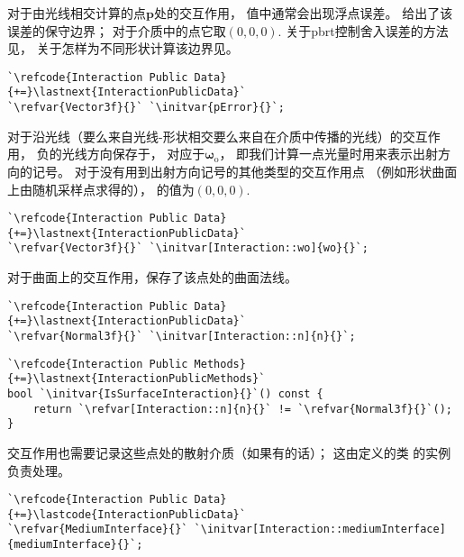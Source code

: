 对于由光线相交计算的点$\bm p$处的交互作用，
值中通常会出现浮点误差。
给出了该误差的保守边界；
对于介质中的点它取$(0,0,0)$.
关于pbrt控制舍入误差的方法见，
关于怎样为不同形状计算该边界见。
\begin{lstlisting}
`\refcode{Interaction Public Data}{+=}\lastnext{InteractionPublicData}`
`\refvar{Vector3f}{}` `\initvar{pError}{}`;
\end{lstlisting}

对于沿光线（要么来自光线-形状相交要么来自在介质中传播的光线）的交互作用，
负的光线方向保存于，
对应于$\bm \omega_{\mathrm{o}}$，
即我们计算一点光量时用来表示出射方向的记号。
对于没有用到出射方向记号的其他类型的交互作用点
（例如形状曲面上由随机采样点求得的），
的值为$(0,0,0)$.
\begin{lstlisting}
`\refcode{Interaction Public Data}{+=}\lastnext{InteractionPublicData}`
`\refvar{Vector3f}{}` `\initvar[Interaction::wo]{wo}{}`;
\end{lstlisting}

对于曲面上的交互作用，保存了该点处的曲面法线。
\begin{lstlisting}
`\refcode{Interaction Public Data}{+=}\lastnext{InteractionPublicData}`
`\refvar{Normal3f}{}` `\initvar[Interaction::n]{n}{}`;
\end{lstlisting}
\begin{lstlisting}
`\refcode{Interaction Public Methods}{+=}\lastnext{InteractionPublicMethods}`
bool `\initvar{IsSurfaceInteraction}{}`() const {
    return `\refvar[Interaction::n]{n}{}` != `\refvar{Normal3f}{}`();
}
\end{lstlisting}

交互作用也需要记录这些点处的散射介质（如果有的话）；
这由定义的类
的实例负责处理。
\begin{lstlisting}
`\refcode{Interaction Public Data}{+=}\lastcode{InteractionPublicData}`
`\refvar{MediumInterface}{}` `\initvar[Interaction::mediumInterface]{mediumInterface}{}`;
\end{lstlisting}

